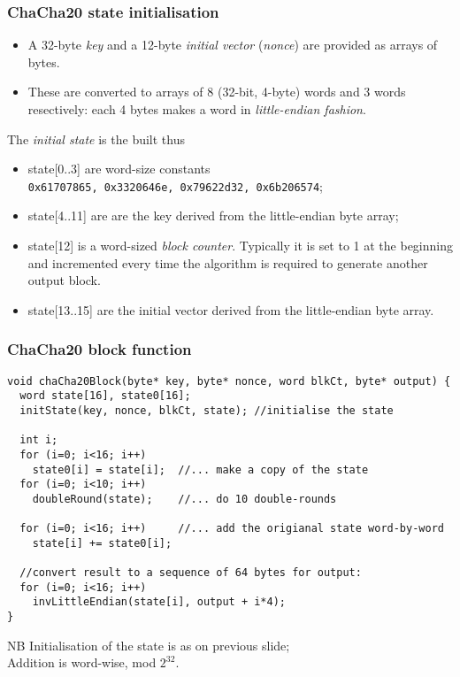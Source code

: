 \documentclass[10pt, hyperref={pdfpagelabels=false}]{beamer}
\begin{document}
\begin{frame}
\frametitle{ChaCha20 state initialisation}
\begin{itemize}
\item A 32-byte \emph{key} and a 12-byte \emph{initial vector} (\emph{nonce}) are provided as arrays of bytes.
\item These are converted to arrays of 8 (32-bit, 4-byte) words and 3 words resectively: each 4 bytes makes a word  in \emph{little-endian fashion}.
\end{itemize}

The \emph{initial state} is the built thus
\begin{itemize}
\item state[0..3] are word-size constants \\\texttt{\color{blue}0x61707865, 0x3320646e, 0x79622d32, 0x6b206574};
\item state[4..11] are are the key derived from the little-endian byte array;
\item state[12] is a word-sized \emph{block counter}. Typically it is set to 1 at the beginning and incremented every time the algorithm is required to generate another output block.
\item state[13..15] are the initial vector derived from the little-endian byte array.
\end{itemize}
\end{frame}

\begin{frame} [fragile]
\frametitle{ChaCha20 block function}
{\color{green!20!black!80} \small
\begin{verbatim}
void chaCha20Block(byte* key, byte* nonce, word blkCt, byte* output) {
  word state[16], state0[16];
  initState(key, nonce, blkCt, state); //initialise the state

  int i;
  for (i=0; i<16; i++)
    state0[i] = state[i];  //... make a copy of the state
  for (i=0; i<10; i++)
    doubleRound(state);    //... do 10 double-rounds

  for (i=0; i<16; i++)     //... add the origianal state word-by-word
    state[i] += state0[i]; 
  
  //convert result to a sequence of 64 bytes for output:  
  for (i=0; i<16; i++)
    invLittleEndian(state[i], output + i*4); 
}
\end{verbatim}
}

NB Initialisation of the state is as on previous slide;\\
Addition is word-wise, mod $2^{32}$.
\end{frame}
\end{document}
